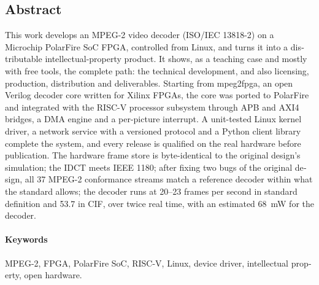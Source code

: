 \vspace{1em}
\begin{otherlanguage}{english}
\section*{Abstract}

This work develops an MPEG-2 video decoder (ISO/IEC 13818-2) on a Microchip
PolarFire SoC FPGA, controlled from Linux, and turns it into a distributable
intellectual-property product. It shows, as a teaching case and mostly with
free tools, the complete path: the technical development, and also
licensing, production, distribution and deliverables. Starting from
mpeg2fpga, an open Verilog decoder core written for Xilinx FPGAs, the core
was ported to PolarFire and integrated with the RISC-V processor subsystem
through APB and AXI4 bridges, a DMA engine and a per-picture interrupt. A
unit-tested Linux kernel driver, a network service with a versioned protocol
and a Python client library complete the system, and every release is
qualified on the real hardware before publication. The hardware frame store
is byte-identical to the original design's simulation; the IDCT meets IEEE
1180; after fixing two bugs of the original design, all 37 MPEG-2
conformance streams match a reference decoder within what the standard
allows; the decoder runs at 20--23 frames per second in standard definition
and 53.7 in CIF, over twice real time, with an estimated 68~mW for the
decoder.

\paragraph{Keywords}
MPEG-2, FPGA, PolarFire SoC, RISC-V, Linux, device driver, intellectual
property, open hardware.
\end{otherlanguage}
